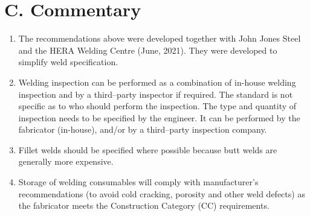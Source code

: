 \section*{C. Commentary}
\begin{enumerate}
\item The recommendations above were developed together with John Jones Steel and the HERA Welding Centre (June, 2021).
They were developed to simplify weld specification.
\item Welding inspection can be performed as a combination of in-house welding inspection and by a third--party inspector if required.
The standard is not specific as to who should perform the inspection.
The type and quantity of inspection needs to be specified by the engineer.
It can be performed by the fabricator (in-house), and/or by a third--party inspection company.
\item Fillet welds should be specified where possible because butt welds are generally more expensive.
\item Storage of welding consumables will comply with manufacturer's recommendations (to avoid cold cracking, porosity and other weld defects) as the fabricator meets the Construction Category (CC) requirements.
\end{enumerate}